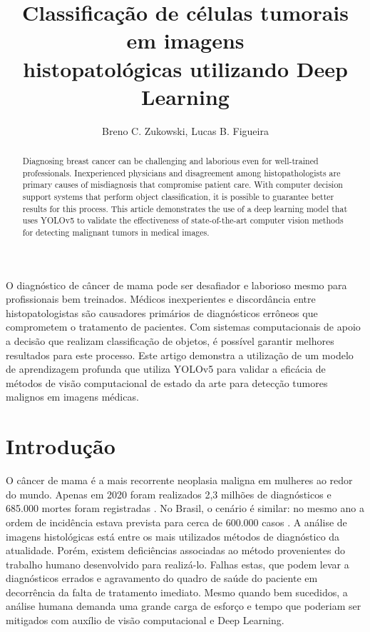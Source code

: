 \documentclass[12pt]{article}
\title{Classificação de células tumorais em imagens\\ histopatológicas utilizando Deep Learning}
\author{Breno C. Zukowski\inst{1}, Lucas B. Figueira\inst{1}}
\begin{document}
\maketitle

\begin{abstract}
  Diagnosing breast cancer can be challenging and laborious even for well-trained professionals.
  Inexperienced physicians and disagreement among histopathologists are primary causes of misdiagnosis
  that compromise patient care. With computer decision support systems that perform object classification, it is possible to guarantee better results for this process. This article demonstrates the use
  of a deep learning model that uses YOLOv5 to validate the effectiveness of state-of-the-art computer vision methods for detecting malignant tumors in medical images.
\end{abstract}

\begin{resumo}
  O diagnóstico de câncer de mama pode ser desafiador e laborioso mesmo para profissionais bem treinados.
  Médicos inexperientes e discordância entre histopatologistas são causadores primários de diagnósticos errôneos
  que comprometem o tratamento de pacientes. Com sistemas computacionais de apoio a decisão que realizam classificação de objetos, é possível garantir melhores resultados para este processo. Este artigo demonstra a utilização
  de um modelo de aprendizagem profunda que utiliza YOLOv5 para validar a eficácia de métodos de visão computacional de estado da arte para detecção tumores malignos em imagens médicas.
\end{resumo}


\section{Introdução}

O câncer de mama é a mais recorrente neoplasia maligna em mulheres ao redor do mundo. Apenas em 2020 foram realizados 2,3 milhões de diagnósticos e 685.000 mortes foram registradas \cite{who2021}. No Brasil, o cenário é similar: no mesmo ano a ordem de incidência estava prevista para cerca de 600.000 casos \cite{inca2018}. A análise de imagens histológicas está entre os mais utilizados métodos de diagnóstico da atualidade. Porém, existem deficiências associadas ao método provenientes do trabalho humano desenvolvido para realizá-lo. Falhas estas, que podem levar a diagnósticos errados e agravamento do quadro de saúde do paciente em decorrência da falta de tratamento imediato. Mesmo quando bem sucedidos, a análise humana demanda uma grande carga de esforço e tempo que poderiam ser mitigados com auxílio de visão computacional e Deep Learning.
\end{document}
